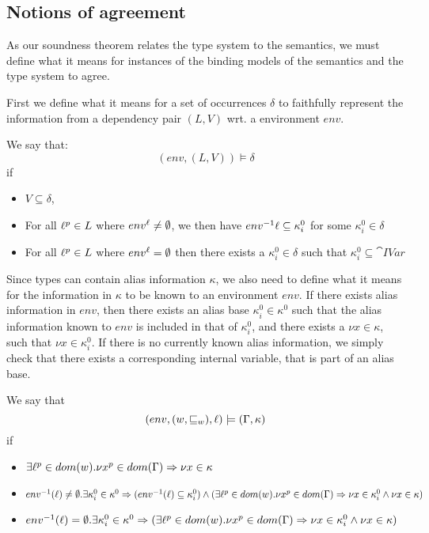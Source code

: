 \documentclass{llncs}
\newcommand{\sqleq}{\ensuremath{\sqsubseteq\xspace}}
\begin{document}
\subsection{Notions of agreement}

As our soundness theorem relates the type system to the semantics, we
must define what it means for instances of the binding models of the
semantics and the type system to agree.

First we define what it means for a set of occurrences $\delta$ to
faithfully represent the information from a dependency pair $(L,V)$
wrt. a environment $env$.

\begin{definition}\label{def:DepAgree}
	We say that:
	$$(env,(L,V))\models\delta$$
	if
	\begin{itemize}
		\item $V\subseteq\delta$,
		\item For all $\ell^p\in L$ where
                  $env^{\ell}\neq\emptyset$, we then have $env^{-1} \ell \subseteq \kappa_i^0$ for some $\kappa_i^0\in\delta$
		\item For all $\ell^p\in L$ where $env^{\ell}=\emptyset$ then there exists a $\kappa_i^0\in\delta$ such that $\kappa_i^0\subseteq\cat{IVar}$
	\end{itemize}
      \end{definition}

      Since types can contain alias information $\kappa$, we also need
      to define what it means for the information in $\kappa$ to be
      known to an environment $env$.  If there exists alias
      information in $env$, then there exists an alias base
      $\kappa^0_i\in\kappa^0$ such that the alias information known to
      $env$ is included in that of $\kappa^0_i$, and there exists a
      $\nu x\in\kappa$, such that $\nu x\in \kappa^0_i$.  If there is
      no currently known alias information, we simply check that there
      exists a corresponding internal variable, that is part of an
      alias base.

      \begin{definition}\label{def:AliasAgree}
	We say that
	$$(env,(w,\sqleq_w),\loc)\models(\Gamma,\kappa)$$
	if
	\begin{itemize}
		\item $\exists \ell^p\in dom(w).\nu x^p\in dom(\Gamma)\Rightarrow\nu x\in\kappa$
		\item $env^{-1}(\ell)\neq\emptyset.\exists \kappa^0_i\in\kappa^0\Rightarrow
			(env^{-1}(\ell)\subseteq\kappa^0_i)\wedge(\exists \ell^p\in dom(w).\nu x^p\in dom(\Gamma)\Rightarrow\nu x\in\kappa^0_i\wedge\nu x\in\kappa)$
		\item $env^{-1}(\ell)=\emptyset.\exists \kappa^0_i\in\kappa^0\Rightarrow
			(\exists \ell^p\in dom(w).\nu x^p\in dom(\Gamma)\Rightarrow\nu x\in\kappa^0_i\wedge\nu x\in\kappa)$
	\end{itemize}
\end{definition}
\end{document}
